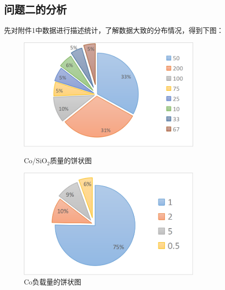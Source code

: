 \documentclass[a4paper,10.5pt]{ctexart}
\begin{document}
\subsection{问题二的分析}
先对附件1中数据进行描述统计，了解数据大致的分布情况，得到下图：
\begin{figure}[h]
\centering
\begin{minipage}[t]{0.48\textwidth}
\centering
\includegraphics[width=9cm]{CoSiO2质量.png}
\caption{Co/SiO$_2$质量的饼状图}
\end{minipage}
\begin{minipage}[t]{0.48\textwidth}
\centering
\includegraphics[width=9cm]{Co负载量.png}
\caption{Co负载量的饼状图}
\end{minipage}
\end{figure}
\end{document}
